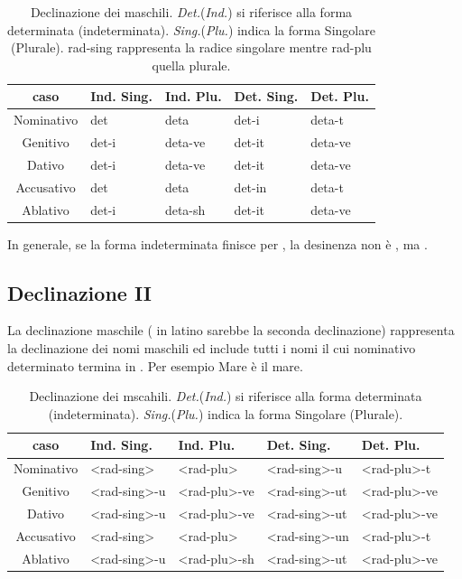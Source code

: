 \begin{table}[H]
    \centering
    \begin{tabular}{cllll}
        \toprule
        caso        & Ind. Sing.         & Ind. Plu.        & Det. Sing.      & Det. Plu. \\
        \midrule
        Nominativo  & det         & deta        & det-i    & deta-t  \\
        Genitivo    & det-i       & deta-ve     & det-it   & deta-ve \\
        Dativo      & det-i       & deta-ve     & det-it   & deta-ve \\
        Accusativo  & det         & deta        & det-in   & deta-t \\
        Ablativo    & det-i       & deta-sh     & det-it   & deta-ve \\
        \bottomrule
    \end{tabular}
    \caption{Declinazione dei maschili. \textit{Det.}(\textit{Ind.}) si riferisce alla forma determinata (indeterminata). \textit{Sing.}(\textit{Plu.}) indica la forma Singolare (Plurale). rad-sing rappresenta la radice singolare mentre rad-plu quella plurale.}
    \label{decl:1:det}
\end{table}

In generale, se la forma indeterminata finisce per , la desinenza non è , ma .

\subsection{Declinazione II}

La declinazione maschile (\ie{} in latino sarebbe la seconda declinazione) rappresenta la declinazione dei nomi maschili ed include tutti i nomi il cui nominativo determinato termina in . Per esempio \glsdesc{Mare} è il mare.

\begin{table}[H]
    \centering
    \begin{tabular}{cllll}
        \toprule
        caso        & Ind. Sing.         & Ind. Plu.        & Det. Sing.      & Det. Plu. \\
        \midrule
        Nominativo  & <rad-sing>         & <rad-plu>        & <rad-sing>-u    & <rad-plu>-t  \\
        Genitivo    & <rad-sing>-u       & <rad-plu>-ve     & <rad-sing>-ut   & <rad-plu>-ve \\
        Dativo      & <rad-sing>-u       & <rad-plu>-ve     & <rad-sing>-ut   & <rad-plu>-ve \\
        Accusativo  & <rad-sing>         & <rad-plu>        & <rad-sing>-un   & <rad-plu>-t \\
        Ablativo    & <rad-sing>-u       & <rad-plu>-sh     & <rad-sing>-ut   & <rad-plu>-ve \\
        \bottomrule
    \end{tabular}
    \caption{Declinazione dei mscahili. \textit{Det.}(\textit{Ind.}) si riferisce alla forma determinata (indeterminata). \textit{Sing.}(\textit{Plu.}) indica la forma Singolare (Plurale).}
\end{table}



